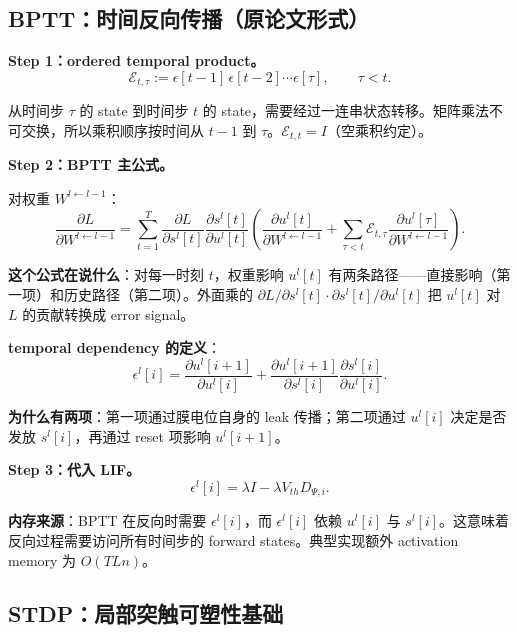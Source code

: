 \documentclass[journal,12pt,onecolumn]{IEEEtran}
\begin{document}
\subsection{BPTT：时间反向传播（原论文形式）}

\textbf{Step 1：ordered temporal product。}
\begin{equation}
\mathcal{E}_{t,\tau}
:=
\epsilon[t-1]\,\epsilon[t-2]\cdots\epsilon[\tau],
\qquad \tau<t.
\end{equation}

从时间步 $\tau$ 的 state 到时间步 $t$ 的 state，需要经过一连串状态转移。矩阵乘法不可交换，所以乘积顺序按时间从 $t-1$ 到 $\tau$。$\mathcal{E}_{t,t}=I$（空乘积约定）。

\textbf{Step 2：BPTT 主公式。}

对权重 $W^{l\leftarrow l-1}$：
\begin{equation}
\frac{\partial L}{\partial W^{l\leftarrow l-1}}
=
\sum_{t=1}^{T}
\frac{\partial L}{\partial s^{l}[t]}
\frac{\partial s^{l}[t]}{\partial u^{l}[t]}
\left(
\frac{\partial u^{l}[t]}{\partial W^{l\leftarrow l-1}}
+
\sum_{\tau<t}
\mathcal{E}_{t,\tau}
\frac{\partial u^{l}[\tau]}{\partial W^{l\leftarrow l-1}}
\right).
\end{equation}

\textbf{这个公式在说什么}：对每一时刻 $t$，权重影响 $u^l[t]$ 有两条路径——直接影响（第一项）和历史路径（第二项）。外面乘的 $\partial L/\partial s^l[t]\cdot\partial s^l[t]/\partial u^l[t]$ 把 $u^l[t]$ 对 $L$ 的贡献转换成 error signal。

\textbf{temporal dependency 的定义}：
\begin{equation}
\epsilon^{l}[i]
=
\frac{\partial u^{l}[i+1]}{\partial u^{l}[i]}
+
\frac{\partial u^{l}[i+1]}{\partial s^{l}[i]}
\frac{\partial s^{l}[i]}{\partial u^{l}[i]}.
\end{equation}

\textbf{为什么有两项}：第一项通过膜电位自身的 leak 传播；第二项通过 $u^l[i]$ 决定是否发放 $s^l[i]$，再通过 reset 项影响 $u^l[i+1]$。

\textbf{Step 3：代入 LIF。}
\begin{equation}
\epsilon^{l}[i]=\lambda I-\lambda V_{th}D_{\Psi,i}.
\end{equation}

\textbf{内存来源}：BPTT 在反向时需要 $\epsilon^l[i]$，而 $\epsilon^l[i]$ 依赖 $u^l[i]$ 与 $s^l[i]$。这意味着反向过程需要访问所有时间步的 forward states。典型实现额外 activation memory 为 $O(TLn)$。

\subsection{STDP：局部突触可塑性基础}
\end{document}
